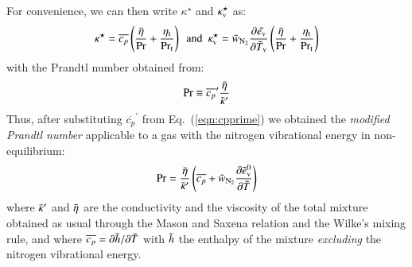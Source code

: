 \documentclass{warpdoc}
\newcommand{\Cp}{{c_{p}}}
\newcommand{\turb}{_{\rm t}}
\newcommand{\etat}{{\eta\turb}}
\newcommand{\ev}{e_{\rm v}}
\newcommand{\tildeevzero}{\wtilde{e}_{\rm v}^0}
\begin{document}
For convenience, we can then write $\kappa^\star$ and $\kappa_{\rm v}^\star$ as:
%
\begin{displaymath}
  \kappa^\star= \overline{\Cp} \left( \frac{\wbar{\eta}}{\rm Pr}+\frac{\etat}{\rm Pr_t} \right)  {\rm       ~~and~~      }
\kappa_{\rm v}^\star = \wtilde{w}_{\rm N_2}\frac{\partial {\wtilde{\ev}}}{\partial {\wtilde{T}_{\rm v}}} \left( \frac{\wbar{\eta}}{\rm Pr}+\frac{\etat}{\rm Pr_t} \right)
\end{displaymath}
%
with the Prandtl number obtained from:
%
\begin{equation}
  {\rm Pr} \equiv
  \overline{\Cp}^\prime \frac{\wbar{\eta}}{\wbar{\kappa}^\prime}
\end{equation}
%
Thus, after substituting $\overline{\Cp}^\prime$ from  Eq.\ (\ref{eqn:cpprime}) we obtained the \emph{modified Prandtl number} applicable to a gas with the nitrogen vibrational energy in non-equilibrium:
%
\begin{equation}
  {\rm Pr} =
   \frac{\wbar{\eta}}{\wbar{\kappa}^\prime} \left(\overline{\Cp}+ {\wtilde{w}_{\rm N_2}} \frac{\partial \tildeevzero}{\partial \wtilde{T}} \right)
\end{equation}
%
where $\bar{\kappa}^\prime$ and $\bar{\eta}$ are the conductivity and the viscosity of the total mixture obtained as usual  through the Mason and Saxena relation and the Wilke's mixing rule, and where $\overline{\Cp}=\partial \wtilde{h}/\partial \wtilde{T}$ with $\tilde{h}$ the enthalpy of the mixture \emph{excluding} the nitrogen vibrational energy.
\end{document}
